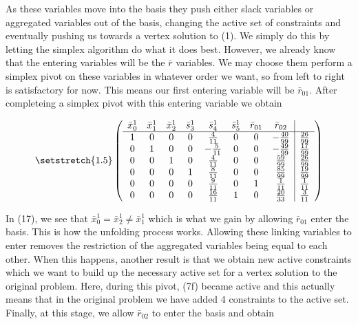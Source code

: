\documentclass[11pt]{article} %
\begin{document}
	As these variables move into the basis they push either slack variables or aggregated variables out of the basis, changing the active set of constraints and eventually pushing us towards a vertex solution to (1).  We simply do this by letting the simplex algorithm do what it does best.  However, we already know that the entering variables will be the $\bar{r}$ variables.  We may choose them perform a simplex pivot on these variables in whatever order we want, so from left to right is satisfactory for now.  This means our first entering variable will be $\bar{r}_{01}$.  After completeing a simplex pivot with this entering variable we obtain 
	
	\begin{equation}\setstretch{1.5}
	\begin{pmatrix}
	\begin{array}{cccccccc|c}
	\bar{x}^1_0 & \bar{x}^1_1 & \bar{x}^1_2 & \bar{s}^1_3 & \bar{s}^1_4 & \bar{s}^1_5 & \bar{r}_{01} & \bar{r}_{02} \\
	\hline
	1 & 0 & 0 & 0 & \frac{4}{11} & 0 & 0 & -\frac{40}{99} & \frac{26}{99} \\ 
	0 & 1 & 0 & 0 & -\frac{5}{11} & 0 &  0 & -\frac{49}{99} & \frac{17}{99} \\ 
	0 & 0 & 1 & 0 & \frac{4}{11} & 0 & 0 & \frac{59}{99} & \frac{26}{99} \\ 
	0 & 0 & 0 & 1 & \frac{8}{11} & 0 & 0 & \frac{85}{99} & \frac{19}{99} \\ 
	0 & 0 & 0 & 0 & \frac{9}{11} & 0 & 1 & \frac{1}{11} & \frac{1}{11} \\
	0 & 0 & 0 & 0 & \frac{16}{11} & 1 & 0 & \frac{20}{33} & \frac{3}{11} \\
	\end{array}
	\end{pmatrix}
	\end{equation}
	
	In (17), we see that $\bar{x}_0^1 = \bar{x}_2^1 \neq \bar{x}_1^1$ which is what we gain by allowing $\bar{r}_{01}$ enter the basis.  This is how the unfolding process works.  Allowing these linking variables to enter removes the restriction of the aggregated variables being equal to each other.  When this happens, another result is that we obtain new active constraints which we want to build up the necessary active set for a vertex solution to the original problem.  Here, during this pivot, (7f) became active and this actually means that in the original problem we have added 4 constraints to the active set.  Finally, at this stage, we allow $\bar{r}_{02}$ to enter the basis and obtain
\end{document}
